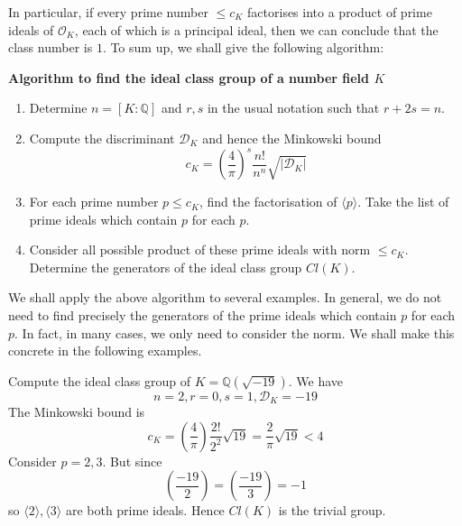 In particular, if every prime number $\le c_K$ factorises into a product of prime ideals of $\mathcal{O}_K$, each
of which is a principal ideal, then we can conclude that the class number is $1$. To sum up, we shall give the following algorithm:
\begin{flushleft}
{\bf Algorithm to find the ideal class group of a number field $K$}
\end{flushleft}
\begin{enumerate}
\item Determine $n=[K:\mathbb{Q}]$ and $r,s$ in the usual notation such that $r+2s=n$.
\item Compute the discriminant $\mathcal{D}_K$ and hence the Minkowski bound
$$c_K=\left(\frac{4}{\pi}\right)^s \frac{n!}{n^n}\sqrt{|\mathcal{D}_K|}$$
\item For each prime number $p \le c_K$, find the factorisation of $\langle p \rangle$. Take the list of prime ideals which contain $p$ for each $p$.
\item Consider all possible product of these prime ideals with norm $\le c_K$. Determine the generators of
the ideal class group $Cl(K)$.
\end{enumerate}
We shall apply the above algorithm to several examples. In general, we do not need to find precisely the generators
of the prime ideals which contain $p$ for each $p$. In fact, in many cases, we only need to consider the norm.
We shall make this concrete in the following examples.
\begin{example} Compute the ideal class group of $K=\mathbb{Q}(\sqrt{-19})$. We have
$$n=2,r=0,s=1,\mathcal{D}_K=-19$$
The Minkowski bound is
$$c_K=\left(\frac{4}{\pi}\right)\frac{2!}{2^2}\sqrt{19}=\frac{2}{\pi}\sqrt{19}<4$$
Consider $p=2,3$. But since
$$\left(\frac{-19}{2}\right)=\left(\frac{-19}{3}\right)=-1$$
so $\langle 2 \rangle, \langle 3 \rangle$ are both prime ideals. Hence $Cl(K)$ is the trivial group.
\end{example}
